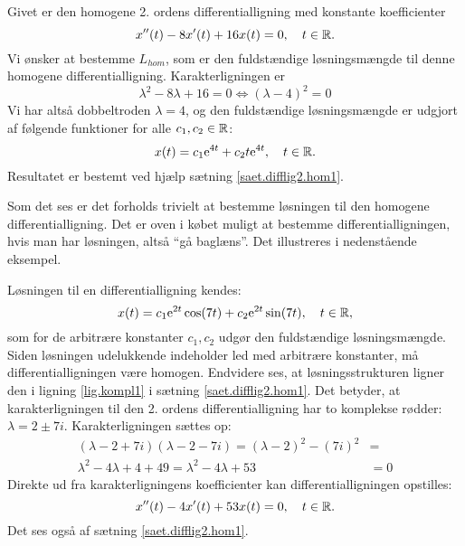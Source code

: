 \begin{example} \label{eks.difflig2.hom31}
Givet er den homogene 2. ordens differentialligning med konstante koefficienter
\begin{equation}
x''(t) - 8x'(t) + 16 x(t) = 0, \quad t \in \mathbb{R}.
\end{equation}
Vi ønsker at bestemme $ L_{hom} $, som er den fuldstændige løsningsmængde til denne homogene differentialligning. Karakterligningen er
\begin{equation}
\lambda^2 - 8\lambda + 16 = 0 \Leftrightarrow (\lambda - 4)^2 = 0
\end{equation}
Vi har altså dobbeltroden $ \lambda = 4 $, og den fuldstændige løsningsmængde er udgjort af følgende funktioner for alle $ c_1,c_2 \in \mathbb{R} $:
\begin{equation}
x(t) = c_1\mathrm{e}^{4t} + c_2t\mathrm{e}^{4t}, \quad t \in \mathbb{R}.
\end{equation}
Resultatet er bestemt ved hjælp sætning \ref{saet.difflig2.hom1}. 
\end{example}

Som det ses er det forholds trivielt at bestemme løsningen til den homogene differentialligning. Det er oven i købet muligt at bestemme differentialligningen, hvis man har løsningen, altså ``gå baglæns''. Det illustreres i nedenstående eksempel.

\begin{example} \label{eks.baglaens}
Løsningen til en differentialligning kendes:
\begin{equation}
x(t) = c_1\mathrm{e}^{2t}\cos(7t) + c_2\mathrm{e}^{2t}\sin(7t), \quad t \in \mathbb{R},
\end{equation}
som for de arbitrære konstanter $ c_1,c_2 $ udgør den fuldstændige løsningsmængde. \bs
Siden løsningen udelukkende indeholder led med arbitrære konstanter, må differentialligningen være homogen. Endvidere ses, at løsningsstrukturen ligner den i ligning \eqref{lig.kompl1} i sætning \ref{saet.difflig2.hom1}. Det betyder, at karakterligningen til den 2. ordens differentialligning har to komplekse rødder: $ \lambda = 2 \pm 7i $. Karakterligningen sættes op:
\begin{equation}
\begin{aligned}
(\lambda - 2 + 7i)(\lambda - 2 - 7i) = (\lambda-2)^2 - (7i)^2 &= \\
\lambda^2 -4\lambda + 4 + 49 = \lambda^2 -4\lambda + 53 &= 0
\end{aligned}
\end{equation}
Direkte ud fra karakterligningens koefficienter kan differentialligningen opstilles:
\begin{equation}
x''(t) -4x'(t) + 53x(t) = 0, \quad t \in \mathbb{R}.
\end{equation}
Det ses også af sætning \ref{saet.difflig2.hom1}.
\end{example}

